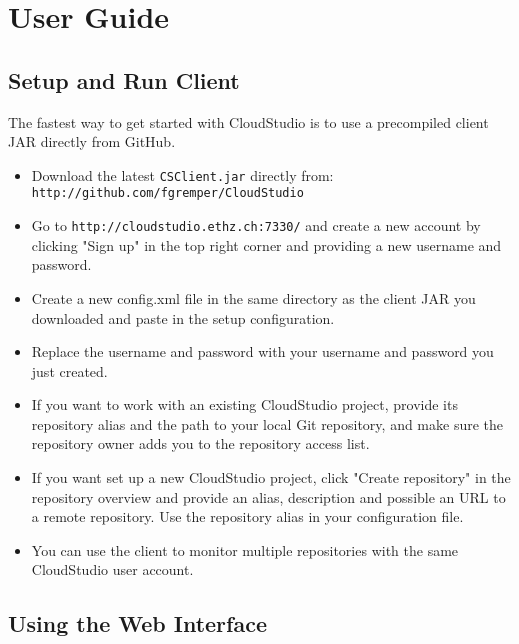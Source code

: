 

\chapter{User Guide}\label{userguide}





\section{Setup and Run Client}

The fastest way to get started with CloudStudio is to use a precompiled client JAR directly from GitHub.

\begin{itemize}

\item Download the latest \texttt{CSClient.jar} directly from: \newline \texttt{http://github.com/fgremper/CloudStudio}

\item Go to \texttt{http://cloudstudio.ethz.ch:7330/} and create a new account by clicking "Sign up" in the top right corner and providing a new username and password.

\item Create a new config.xml file in the same directory as the client JAR you downloaded and paste in the setup configuration.

\item Replace the username and password with your username and password you just created.

\item If you want to work with an existing CloudStudio project, provide its repository alias and the path to your local Git repository, and make sure the repository owner adds you to the repository access list.

\item If you want set up a new CloudStudio project, click "Create repository" in the repository overview and provide an alias, description and possible an URL to a remote repository. Use the repository alias in your configuration file.

\item You can use the client to monitor multiple repositories with the same CloudStudio user account.

\end{itemize}

\section{Using the Web Interface}\label{webinterfaceguide}
